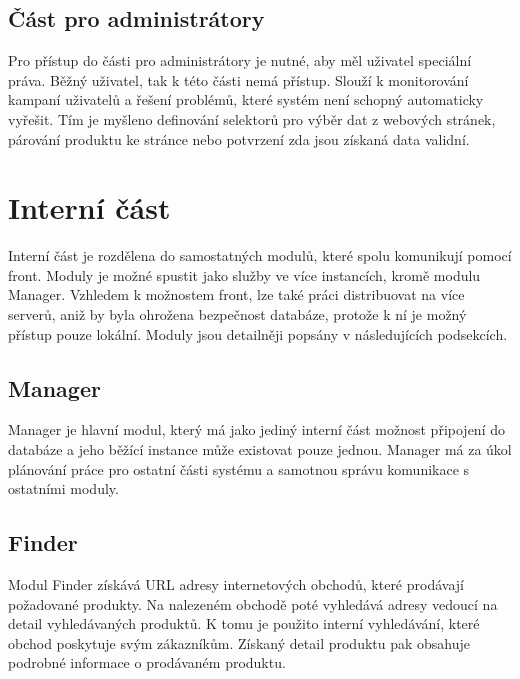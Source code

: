 \documentclass[thesis=B,czech]{FITthesis}[2012/06/26]
\begin{document}
\subsection{Část pro administrátory}
Pro přístup do části pro administrátory je nutné, aby měl uživatel speciální práva. Běžný uživatel, tak k této části nemá přístup. Slouží k monitorování kampaní uživatelů a řešení problémů, které systém není schopný 
automaticky vyřešit. Tím je myšleno definování selektorů pro výběr dat z webových stránek, párování produktu ke stránce 
nebo potvrzení zda jsou získaná data validní.

\section{Interní část}
Interní část je rozdělena do samostatných modulů, které spolu komunikují pomocí front. Moduly je možné spustit jako služby ve více 
instancích, kromě modulu Manager. Vzhledem k možnostem front, lze také práci distribuovat na více serverů, aniž by byla ohrožena 
bezpečnost databáze, protože k ní je možný přístup pouze lokální. Moduly jsou detailněji popsány v následujících podsekcích.
\subsection{Manager}
Manager je hlavní modul, který má jako jediný interní část možnost připojení do databáze a jeho běžící instance může existovat pouze jednou.
Manager má za úkol plánování práce pro ostatní části systému a samotnou správu komunikace s ostatními moduly.
\subsection{Finder}
Modul Finder získává URL adresy internetových obchodů, které prodávají požadované produkty.
Na nalezeném obchodě poté vyhledává adresy vedoucí na detail vyhledávaných produktů. K tomu je použito interní vyhledávání, které
obchod poskytuje svým zákazníkům. Získaný detail produktu pak obsahuje podrobné informace o prodávaném produktu.
\end{document}
